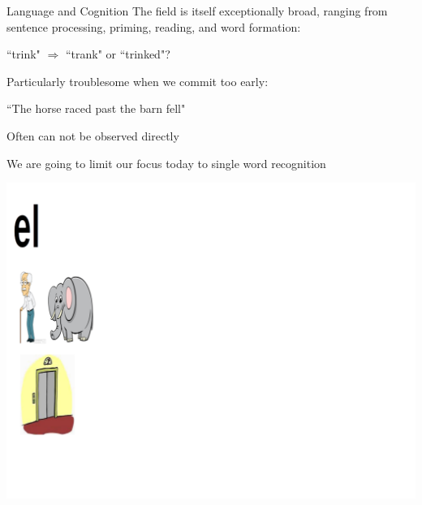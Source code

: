 \documentclass{beamer}
\newcommand{\vp}{\vspace{2mm}}
\begin{document}
\begin{frame}{Language and Cognition}
The field is itself exceptionally broad, ranging from sentence processing, priming, reading, and word formation:

\begin{center}
``trink" $\Rightarrow$ ``trank" or ``trinked"? \vp
\end{center}

Particularly troublesome when we commit too early:

\begin{center}
``The horse raced past the barn fell"  \vp
\end{center}

Often can not be observed directly  \vp

We are going to limit our focus today to single word recognition



\end{frame}


\begin{frame}
\begin{center}
\includegraphics[scale=0.3]{img/ele_1.png}
\end{center}
\end{frame}
\end{document}
